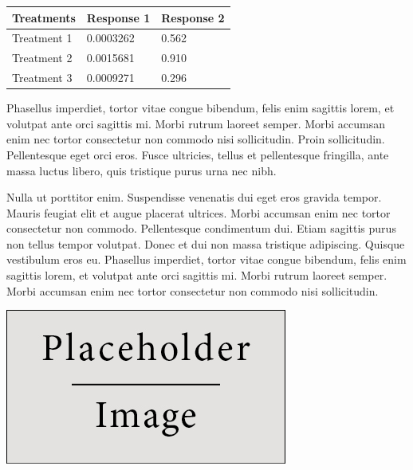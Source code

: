 \documentclass[a0,portrait]{a0poster}
\begin{document}
\begin{multicols}{2}
%
\begin{table} %
\begin{tabular}{l l l}
\toprule
\textbf{Treatments} & \textbf{Response 1} & \textbf{Response 2}\\
\midrule
Treatment 1 & 0.0003262 & 0.562 \\
Treatment 2 & 0.0015681 & 0.910 \\
Treatment 3 & 0.0009271 & 0.296 \\
\bottomrule
\end{tabular}
\end{table}
%
Phasellus imperdiet, tortor vitae congue bibendum, felis enim sagittis lorem, et volutpat ante orci sagittis mi. Morbi rutrum laoreet semper. Morbi accumsan enim nec tortor consectetur non commodo nisi sollicitudin. Proin sollicitudin. Pellentesque eget orci eros. Fusce ultricies, tellus et pellentesque fringilla, ante massa luctus libero, quis tristique purus urna nec nibh.

Nulla ut porttitor enim. Suspendisse venenatis dui eget eros gravida tempor. Mauris feugiat elit et augue placerat ultrices. Morbi accumsan enim nec tortor consectetur non commodo. Pellentesque condimentum dui. Etiam sagittis purus non tellus tempor volutpat. Donec et dui non massa tristique adipiscing. Quisque vestibulum eros eu. Phasellus imperdiet, tortor vitae congue bibendum, felis enim sagittis lorem, et volutpat ante orci sagittis mi. Morbi rutrum laoreet semper. Morbi accumsan enim nec tortor consectetur non commodo nisi sollicitudin.

\begin{center}\vspace{1cm}
\includegraphics[width=0.8\linewidth]{placeholder}
\end{center}\vspace{1cm}


\end{multicols}
\end{document}
